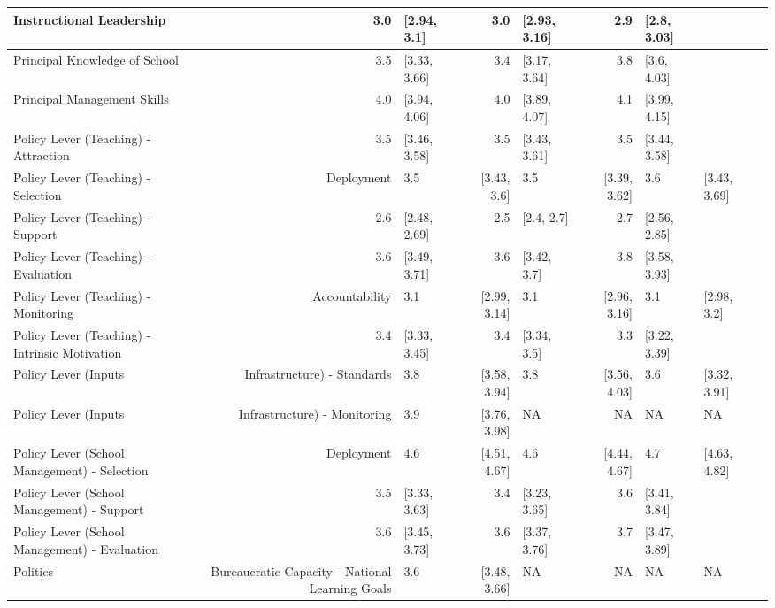 \documentclass[
]{article}
\begin{document}
\begin{table}
\begin{tabular}[t]{l|r|l|r|l|r|l|l}
\hline
Instructional Leadership & 3.0 & [2.94, 3.1] & 3.0 & [2.93, 3.16] & 2.9 & [2.8, 3.03] & \\
\hline
Principal Knowledge of School & 3.5 & [3.33, 3.66] & 3.4 & [3.17, 3.64] & 3.8 & [3.6, 4.03] & \\
\hline
Principal Management Skills & 4.0 & [3.94, 4.06] & 4.0 & [3.89, 4.07] & 4.1 & [3.99, 4.15] & \\
\hline
Policy Lever (Teaching) - Attraction & 3.5 & [3.46, 3.58] & 3.5 & [3.43, 3.61] & 3.5 & [3.44, 3.58] & \\
\hline
Policy Lever (Teaching) - Selection & Deployment & 3.5 & [3.43, 3.6] & 3.5 & [3.39, 3.62] & 3.6 & [3.43, 3.69] & \\
\hline
Policy Lever (Teaching) - Support & 2.6 & [2.48, 2.69] & 2.5 & [2.4, 2.7] & 2.7 & [2.56, 2.85] & \\
\hline
Policy Lever (Teaching) - Evaluation & 3.6 & [3.49, 3.71] & 3.6 & [3.42, 3.7] & 3.8 & [3.58, 3.93] & \\
\hline
Policy Lever (Teaching) - Monitoring & Accountability & 3.1 & [2.99, 3.14] & 3.1 & [2.96, 3.16] & 3.1 & [2.98, 3.2] & \\
\hline
Policy Lever (Teaching) - Intrinsic Motivation & 3.4 & [3.33, 3.45] & 3.4 & [3.34, 3.5] & 3.3 & [3.22, 3.39] & \\
\hline
Policy Lever (Inputs & Infrastructure) - Standards & 3.8 & [3.58, 3.94] & 3.8 & [3.56, 4.03] & 3.6 & [3.32, 3.91] & \\
\hline
Policy Lever (Inputs & Infrastructure) - Monitoring & 3.9 & [3.76, 3.98] & NA & NA & NA & NA & \\
\hline
Policy Lever (School Management) - Selection & Deployment & 4.6 & [4.51, 4.67] & 4.6 & [4.44, 4.67] & 4.7 & [4.63, 4.82] & \\
\hline
Policy Lever (School Management) - Support & 3.5 & [3.33, 3.63] & 3.4 & [3.23, 3.65] & 3.6 & [3.41, 3.84] & \\
\hline
Policy Lever (School Management) - Evaluation & 3.6 & [3.45, 3.73] & 3.6 & [3.37, 3.76] & 3.7 & [3.47, 3.89] & \\
\hline
Politics & Bureaucratic Capacity - National Learning Goals & 3.6 & [3.48, 3.66] & NA & NA & NA & NA & \\

\end{tabular}
\end{table}
\end{document}
